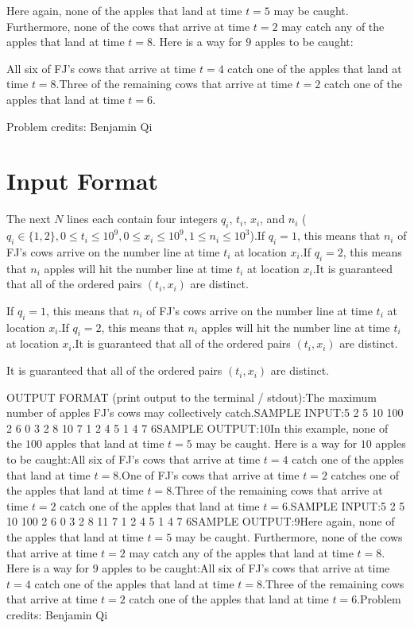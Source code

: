 \documentclass[12pt]{article}
\begin{document}
Here again, none of the apples that land at time $t=5$ may be caught. Furthermore,
none of the cows that arrive at time $t=2$ may catch any of the apples that land
at time $t=8$. Here is a way for $9$ apples to be caught:

All six of FJ's cows that arrive at time $t=4$ catch one of the apples that
land at time $t=8$.Three of the remaining cows that arrive at time $t=2$ catch one of the
apples that land at time $t=6$.

Problem credits: Benjamin Qi



\section*{Input Format}
The next $N$ lines each contain four integers $q_i$, $t_i$, $x_i$, and $n_i$
($q_i\in \{1,2\}, 0\le t_i\le 10^9, 0\le x_i\le 10^9, 1\le n_i\le 10^3$).If $q_i=1$, this means that $n_i$ of FJ's cows arrive on the number line at
time $t_i$ at location $x_i$.If $q_i=2$, this means that $n_i$ apples will hit the number line at time
$t_i$ at location $x_i$.It is guaranteed that all of the ordered pairs $(t_i,x_i)$ are distinct.

If $q_i=1$, this means that $n_i$ of FJ's cows arrive on the number line at
time $t_i$ at location $x_i$.If $q_i=2$, this means that $n_i$ apples will hit the number line at time
$t_i$ at location $x_i$.It is guaranteed that all of the ordered pairs $(t_i,x_i)$ are distinct.

It is guaranteed that all of the ordered pairs $(t_i,x_i)$ are distinct.

OUTPUT FORMAT (print output to the terminal / stdout):The maximum number of apples FJ's cows may collectively catch.SAMPLE INPUT:5
2 5 10 100
2 6 0 3
2 8 10 7
1 2 4 5
1 4 7 6SAMPLE OUTPUT:10In this example, none of the $100$ apples that land at time $t=5$ may be caught. Here is a way
for $10$ apples to be caught:All six of FJ's cows that arrive at time $t=4$ catch one of the apples that
land at time $t=8$.One of FJ's cows that arrive at time $t=2$ catches one of the apples that
land at time $t=8$.Three of the remaining cows that arrive at time $t=2$ catch one of the
apples that land at time $t=6$.SAMPLE INPUT:5
2 5 10 100
2 6 0 3
2 8 11 7
1 2 4 5
1 4 7 6SAMPLE OUTPUT:9Here again, none of the apples that land at time $t=5$ may be caught. Furthermore,
none of the cows that arrive at time $t=2$ may catch any of the apples that land
at time $t=8$. Here is a way for $9$ apples to be caught:All six of FJ's cows that arrive at time $t=4$ catch one of the apples that
land at time $t=8$.Three of the remaining cows that arrive at time $t=2$ catch one of the
apples that land at time $t=6$.Problem credits: Benjamin Qi
\end{document}
